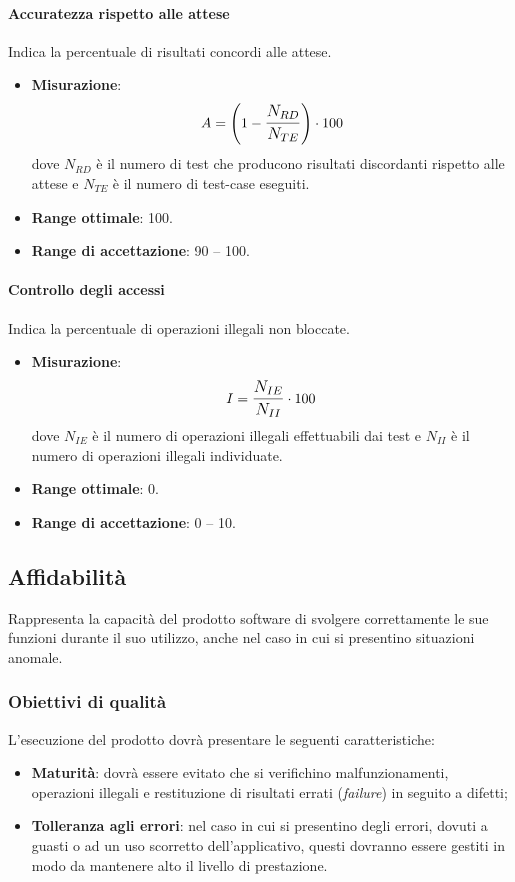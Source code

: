 \paragraph{Accuratezza rispetto alle attese}
Indica la percentuale di risultati concordi alle attese.
\begin{itemize}
	\item \textbf{Misurazione}: 
		$$A=\left(1-\mathlarger{\frac{N_{RD}}{N_{TE}}}\right) \cdot 100$$
	dove $N_{RD}$ è il numero di test che producono risultati discordanti rispetto alle attese e $N_{TE}$ è il numero di test-case eseguiti.
	\item \textbf{Range ottimale}: 100.
	\item \textbf{Range di accettazione}: 90 -- 100.
\end{itemize}

\paragraph{Controllo degli accessi}
Indica la percentuale di operazioni illegali non bloccate.
\begin{itemize}
	\item \textbf{Misurazione}: 
		$$I=\mathlarger{\frac{N_{IE}}{N_{II}}} \cdot 100$$
	dove $N_{IE}$ è il numero di operazioni illegali effettuabili dai test e $N_{II}$ è il numero di operazioni illegali individuate.
	\item \textbf{Range ottimale}: 0.
	\item \textbf{Range di accettazione}: 0 -- 10.
\end{itemize}


\subsection{Affidabilità}
Rappresenta la capacità del prodotto software di svolgere correttamente le sue funzioni durante il suo utilizzo, anche nel caso in cui si presentino situazioni anomale.

\subsubsection{Obiettivi di qualità}
L'esecuzione del prodotto dovrà presentare le seguenti caratteristiche:
\begin{itemize}
\item \textbf{Maturità}: dovrà essere evitato che si verifichino malfunzionamenti, operazioni illegali e restituzione di risultati errati (\textit{failure}) in seguito a difetti;
\item \textbf{Tolleranza agli errori}: nel caso in cui si presentino degli errori, dovuti a guasti o ad un uso scorretto dell'applicativo, questi dovranno essere gestiti in modo da mantenere alto il livello di prestazione.
\end{itemize}

